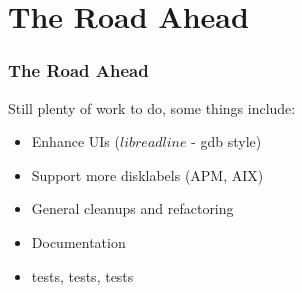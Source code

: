 \section{The Road Ahead}
\begin{frame}\frametitle{The Road Ahead}
  Still plenty of work to do, some things include:
 \begin{itemize}
  \item Enhance UIs ($libreadline$ - gdb style)
  \item Support more disklabels (APM, AIX)
  \item General cleanups and refactoring
  \item Documentation
  \item tests, tests, tests
  \end{itemize}
\end{frame}
